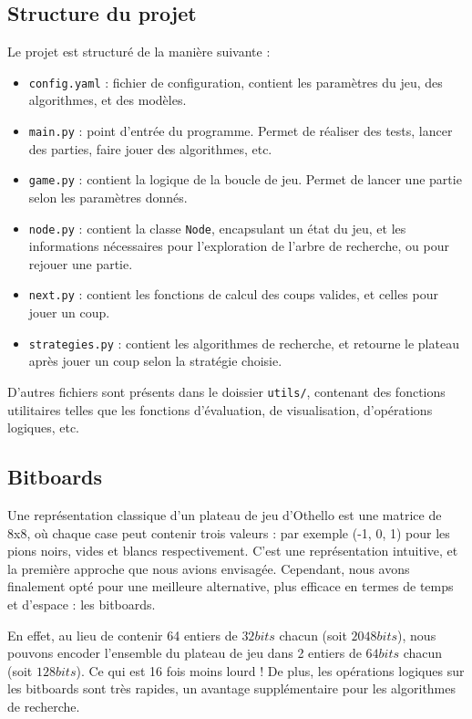 \subsection{Structure du projet}
\label{subsec:struct}
Le projet est structuré de la manière suivante :
\begin{itemize}
    \item \texttt{config.yaml} : fichier de configuration, contient les paramètres du jeu, des algorithmes, et des modèles.
    \item \texttt{main.py} : point d'entrée du programme. Permet de réaliser des tests, lancer des parties, faire jouer des algorithmes, etc.
    \item \texttt{game.py} : contient la logique de la boucle de jeu. Permet de lancer une partie selon les paramètres donnés.
    \item \texttt{node.py} : contient la classe \texttt{Node}, encapsulant un état du jeu, et les informations nécessaires pour l'exploration de l'arbre de recherche, ou pour rejouer une partie.
    \item \texttt{next.py} : contient les fonctions de calcul des coups valides, et celles pour jouer un coup.
    \item \texttt{strategies.py} : contient les algorithmes de recherche, et retourne le plateau après jouer un coup selon la stratégie choisie.
\end{itemize}
D'autres fichiers sont présents dans le doissier \texttt{utils/}, contenant des fonctions utilitaires telles que les fonctions d'évaluation, de visualisation, d'opérations logiques, etc.

\subsection{Bitboards}
\label{subsec:bit}
Une représentation classique d'un plateau de jeu d'Othello est une matrice de 8x8, où chaque case peut contenir trois valeurs : par exemple (-1, 0, 1) pour les pions noirs, vides et blancs respectivement. C'est une représentation intuitive, et la première approche que nous avions envisagée. Cependant, nous avons finalement opté pour une meilleure alternative, plus efficace en termes de temps et d'espace : les bitboards.

En effet, au lieu de contenir 64 entiers de $32 bits$ chacun (soit $2048 bits$), nous pouvons encoder l'ensemble du plateau de jeu dans 2 entiers de $64 bits$ chacun (soit $128bits$). Ce qui est 16 fois moins lourd ! De plus, les opérations logiques sur les bitboards sont très rapides, un avantage supplémentaire pour les algorithmes de recherche.

